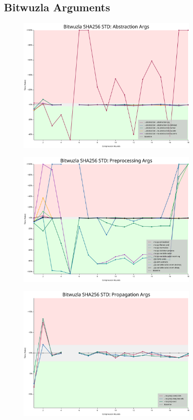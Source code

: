 \subsection{Bitwuzla Arguments}
\begin{figure}[H]
	\centering
	\includegraphics[width=0.8\textwidth]{../../graphs/bitwuzla_abstraction_args.svg}
\end{figure}

\begin{figure}[H]
	\centering
	\includegraphics[width=0.8\textwidth]{../../graphs/bitwuzla_preprocessing_args.svg}
\end{figure}

\begin{figure}[H]
	\centering
	\includegraphics[width=0.8\textwidth]{../../graphs/bitwuzla_propagation_args.svg}
\end{figure}

